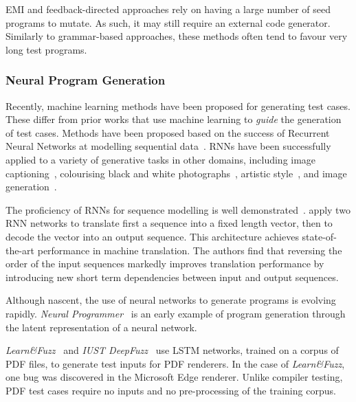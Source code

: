 EMI and feedback-directed approaches rely on having a large number of seed programs to mutate. As such, it may still require an external code generator. Similarly to grammar-based approaches, these methods often tend to favour very long test programs.


\subsubsection{Neural Program Generation}
\label{subsec:related-work-neural-program-generation}

Recently, machine learning methods have been proposed for generating test cases. These differ from prior works that use machine learning to \emph{guide} the generation of test cases.
Methods have been proposed based on the success of Recurrent Neural Networks at modelling sequential data~\cite{Jozefowicz2016a}. RNNs have been successfully applied to a variety of generative tasks in other domains, including image captioning~\cite{Vinyals}, colourising black and white photographs~\cite{Zhang2016}, artistic style~\cite{Gatys2015}, and image generation~\cite{Gregor2014}.

The proficiency of RNNs for sequence modelling is well demonstrated~\cite{Sutskever2014}. \citeauthor{Sutskever2014} apply two RNN networks to translate first a sequence into a fixed length vector, then to decode the vector into an output sequence. This architecture achieves state-of-the-art performance in machine translation. The authors find that reversing the order of the input sequences markedly improves translation performance by introducing new short term dependencies between input and output sequences.

Although nascent, the use of neural networks to generate programs is evolving rapidly. \emph{Neural Programmer}~\cite{Neelakantan2016} is an early example of program generation through the latent representation of a neural network.

%
\emph{Learn\&Fuzz}~\cite{Godefroid2017} and \emph{IUST DeepFuzz}~\cite{Nasrabadi2018} use LSTM networks, trained on a corpus of PDF files, to generate test inputs for PDF renderers. In the case of \emph{Learn\&Fuzz}, one bug was discovered in the Microsoft Edge renderer. Unlike compiler testing, PDF test cases require no inputs and no pre-processing of the training corpus.


